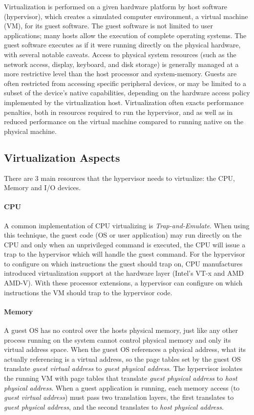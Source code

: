 Virtualization is performed on a given hardware platform by host software (hypervisor), which creates a
simulated computer environment, a virtual machine (VM), for its guest software.
The guest software is not limited to user applications; many hosts allow the execution of complete operating
systems. The guest software executes as if it were running directly on the physical hardware, with several
notable caveats. Access to physical system resources (such as the network access, display, keyboard, and disk
storage) is generally managed at a more restrictive level than the host processor and system-memory. Guests are
often restricted from accessing specific peripheral devices, or may be limited to a subset of the device's
native capabilities, depending on the hardware access policy implemented by the virtualization host.
Virtualization often exacts performance penalties, both in resources required to run the hypervisor,
and as well as in reduced performance on the virtual machine compared to running native on the physical machine.

\subsection*{Virtualization Aspects}
There are 3 main resources that the hypervisor needs to virtualize: the CPU, Memory and I/O devices.

\paragraph {CPU}
A common implementation of CPU virtualizing is \emph{Trap-and-Emulate}. When using this technique,
the guest code (OS or user application) may run directly on the CPU and only when an unprivileged command is
executed, the CPU will issue a trap to the hypervisor which will handle the guest command. For the hypervisor to
configure on which instructions the guest should trap on, CPU manufactures introduced virtualization support at the hardware layer (Intel's VT-x and AMD AMD-V). With these processor extensions, a hypervisor can configure on which instructions the VM should trap to the hypervisor code.

\paragraph {Memory}
A guest OS has no control over the hosts physical memory, just like any other process running on the system cannot control physical memory and only  its virtual address space.
%
When the guest OS references a physical address, what its actually referencing is a virtual address, so the
page tables set by the guest OS translate \emph{guest virtual address} to \emph{guest physical address}.
The hypervisor isolates the running VM with page tables that translate \emph{guest physical address} to \emph{host physical address}. When a guest application is running, each memory access (to \emph{guest virtual address}) must pass two translation layers, the first translates to \emph{guest physical address}, and the second translates to \emph{host physical address}.

